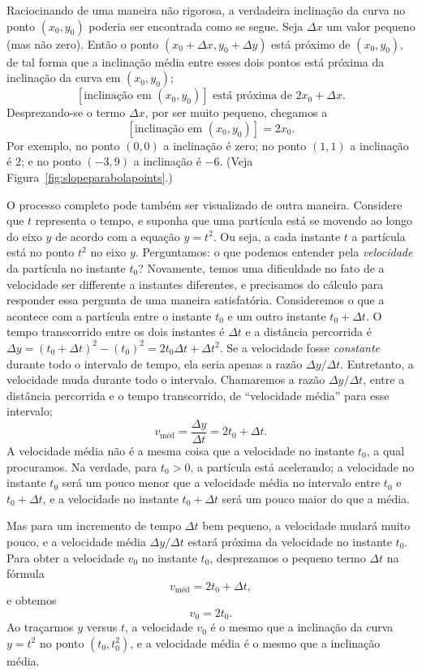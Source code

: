 Raciocinando de uma maneira não rigorosa, a verdadeira inclinação da
curva no ponto $(x_0,y_0)$ poderia ser encontrada como se segue.
Seja $\Delta x$ um valor pequeno (mas não zero). Então o ponto
$(x_0 + \Delta x, y_0 + \Delta y)$ está próximo de $(x_0,y_0)$,
de tal forma que a inclinação média entre esses dois pontos está
próxima da inclinação da curva em $(x_0,y_0)$;
\[
  [\text{inclinação em } (x_0,y_0)] \text{ está próxima de } 2x_0 + \Delta x.
\]
Desprezando-se o termo $\Delta x$, por ser muito pequeno, chegamos
a
\[
  [\text{inclinação em } (x_0,y_0)] = 2x_0.
\]
Por exemplo, no ponto $(0,0)$ a inclinação é zero; no ponto $(1,1)$
a inclinação é $2$; e no ponto $(-3,9)$ a inclinação é $-6$.
(Veja Figura~\ref{fig:slopeparabolapoints}.)


O processo completo pode também ser visualizado de outra maneira.
Considere que $t$ representa o tempo, e suponha que uma partícula
está se movendo ao longo do eixo $y$ de acordo com a equação
$y = t^2$. Ou seja, a cada instante $t$ a partícula está no ponto
$t^2$ no eixo $y$. Perguntamos: o que podemos entender pela
\emph{velocidade} da partícula no instante $t_0$?
Novamente, temos
uma dificuldade no fato de a velocidade ser differente a instantes
diferentes, e precisamos do cálculo para responder essa pergunta
de uma maneira satisfatória. Consideremos o que a acontece com
a partícula entre o instante $t_0$ e um outro instante
$t_0 + \Delta t$. O tempo transcorrido entre os dois instantes
é $\Delta t$ e a distância percorrida é
$\Delta y = (t_0 + \Delta t)^2 - (t_0)^2 = 2t_0 \Delta t + \Delta t^2$.
Se a velocidade fosse \emph{constante} durante todo o intervalo de tempo,
ela seria apenas a razão $\Delta y / \Delta t$. Entretanto, a velocidade
muda durante todo o intervalo. Chamaremos a razão $\Delta y / \Delta t$,
entre a distância percorrida e o tempo transcorrido, de ``velocidade
média'' para esse intervalo;
\[
  v_{\text{méd}} = \frac{\Delta y}{\Delta t} = 2t_0 + \Delta t.
\]
A velocidade média não é a mesma coisa que a velocidade no instante
$t_0$, a qual procuramos. Na verdade, para $t_0 > 0$, a partícula
está acelerando; a velocidade no instante $t_0$ será um pouco menor
que a velocidade média no intervalo entre $t_0$ e $t_0 + \Delta t$,
e a velocidade no instante $t_0 + \Delta t$ será um pouco maior do
que a média.

Mas para um incremento de tempo $\Delta t$ bem pequeno, a velocidade
mudará muito pouco, e a velocidade média $\Delta y/\Delta t$ estará
próxima da velocidade no instante $t_0$. Para obter a velocidade
$v_0$ no instante $t_0$, desprezamos o pequeno termo $\Delta t$ na
fórmula
\[
  v_{\text{méd}} = 2 t_0 + \Delta t,
\]
e obtemos
\[
  v_0 = 2t_0.
\]
Ao traçarmos $y$ versus $t$, a velocidade $v_0$ é o mesmo que a
inclinação da curva $y = t^2$ no ponto $(t_0,t_0^2)$, e a velocidade
média é o mesmo que a inclinação média.


